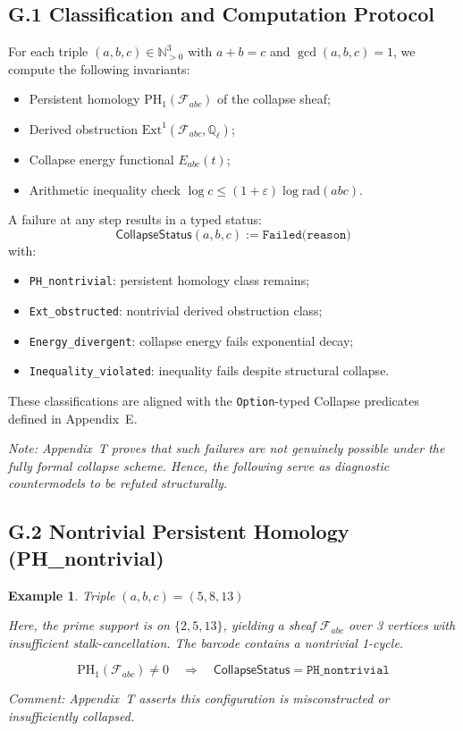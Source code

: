 \documentclass[11pt]{article}
\newtheorem{example}[theorem]{Example}
\begin{document}
\subsection*{G.1 Classification and Computation Protocol}

For each triple \( (a,b,c) \in \mathbb{N}_{>0}^3 \) with \( a + b = c \) and \( \gcd(a,b,c)=1 \), we compute the following invariants:
\begin{itemize}
  \item Persistent homology \( \mathrm{PH}_1(\mathcal{F}_{abc}) \) of the collapse sheaf;
  \item Derived obstruction \( \mathrm{Ext}^1(\mathcal{F}_{abc}, \mathbb{Q}_\ell) \);
  \item Collapse energy functional \( E_{abc}(t) \);
  \item Arithmetic inequality check \( \log c \leq (1+\varepsilon)\log \mathrm{rad}(abc) \).
\end{itemize}

A failure at any step results in a typed status:
\[
\mathsf{CollapseStatus}(a,b,c) := \texttt{Failed(reason)}
\]
with:
\begin{itemize}
  \item \texttt{PH\_nontrivial}: persistent homology class remains;
  \item \texttt{Ext\_obstructed}: nontrivial derived obstruction class;
  \item \texttt{Energy\_divergent}: collapse energy fails exponential decay;
  \item \texttt{Inequality\_violated}: inequality fails despite structural collapse.
\end{itemize}

These classifications are aligned with the \texttt{Option}-typed Collapse predicates defined in Appendix~E.

\vspace{1em}
\noindent
\textit{Note: Appendix~T proves that such failures are not genuinely possible under the fully formal collapse scheme.  
Hence, the following serve as diagnostic countermodels to be refuted structurally.}

\subsection*{G.2 Nontrivial Persistent Homology (PH\_nontrivial)}

\begin{example}
Triple \( (a,b,c) = (5,8,13) \)

Here, the prime support is on \( \{2,5,13\} \), yielding a sheaf \( \mathcal{F}_{abc} \) over 3 vertices with insufficient stalk-cancellation.  
The barcode contains a nontrivial 1-cycle.

\[
\mathrm{PH}_1(\mathcal{F}_{abc}) \neq 0 \quad \Rightarrow \quad \mathsf{CollapseStatus} = \texttt{PH\_nontrivial}
\]

\textit{Comment: Appendix~T asserts this configuration is misconstructed or insufficiently collapsed.}
\end{example}
\end{document}
